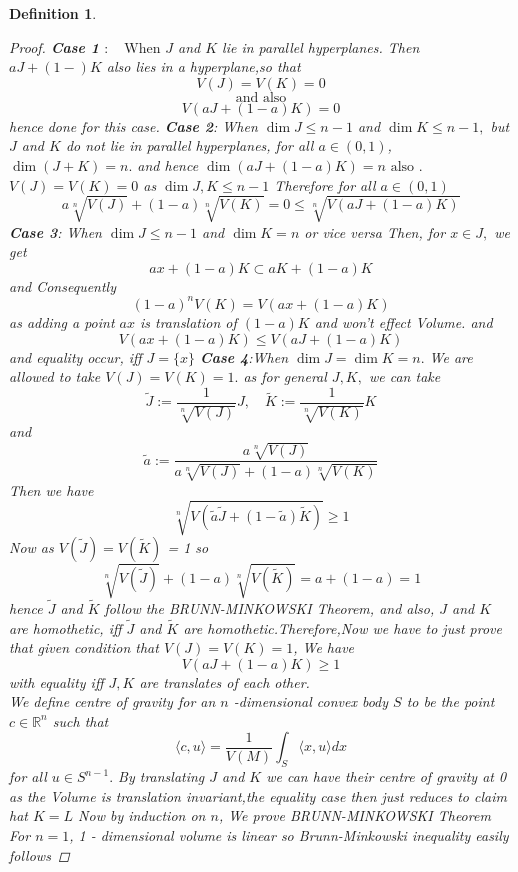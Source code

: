\documentclass[oneside]{book}
\newtheorem{mydef}{Definition}
\begin{document}
\begin{mydef}
\begin{proof}
\textbf{Case 1} $: \quad \text{When } J$ and $K$ lie in parallel hyperplanes. Then  $a J+(1-) K$  also lies in a hyperplane,\quad so that $$V(J)=V(K)=0$$    $$\text{and also}$$ $$V(a J+(1-a) K)=0$$
 hence done for this case.
 \hfill \break
\textbf{Case 2}: \quad  When $\operatorname{dim} J \leq n-1$ and $\operatorname{dim} K \leq n-1,$ but $J$ and $K$ do not lie in parallel hyperplanes, for all $a \in(0,1)$, $\operatorname{dim}(J+K)=n .$ and hence  $\operatorname{dim}(a J+(1-a) K)=n \text{ also }.$ 
\hfill \break
$V(J) = V(K)= 0$ as $\operatorname{dim} J,K \leq n-1 $ Therefore for all $a \in(0,1)$
 $$
a \sqrt[n]{V(J)}+(1-a) \sqrt[n]{V(K)}=0 \leq \sqrt[n]{V(a J+(1-a) K)}
$$
\hfill \break
\textbf{Case 3}: \quad  When $\operatorname{dim } J \leq n-1$ and $\operatorname{dim} K=n$ or vice versa
\hfill \break 
Then, for $x \in J,$ we get
\[
a x+(1-a) K \subset a K+(1-a) K
\]
and Consequently
\[
(1-a)^{n} V(K)=V(a x+(1-a) K) 
\]
as adding a point $a x $ is translation of $(1-a) K$ and won't effect Volume. 
and
$$ V(a x+(1-a) K) \leq V(a 
J+(1-a) K)$$
and equality occur, iff $J=\{x\}$ 
\hfill \break
\textbf{Case 4}:When $\operatorname{dim} J=\operatorname{dim} K=n .$  We are allowed to take $V(J)=V(K)=1 .$ as for general $J, K,$  we  can take
\[
  \widetilde{J}:=\frac{1}{\sqrt[n]{V(J)}} J, \quad \widetilde{K}:=\frac{1}{\sqrt[n]{V(K)}} K
\]
and
\[
\widetilde{a}:=\frac{a \sqrt[n]{V(J)}}{a \sqrt[n]{V(J)}+(1-a) \sqrt[n]{V(K)}}
\]
Then we have
\[
    \sqrt[n]{V({\widetilde{a} \widetilde{ J} }+(1-\widetilde{a}) \widetilde{K})} \geq 1
\]
Now  as $V(\widetilde{J}) = V(\widetilde{K})$ = 1 so $$\sqrt[n]{V(\widetilde{J})}+(1-a) \sqrt[n]{V(\widetilde {K})}=a+(1-a)=1$$
hence $\widetilde{J}$ and $\widetilde{K}$
follow the BRUNN-MINKOWSKI Theorem,  and also, $J$ and $K$ are homothetic, iff $\widetilde{J}$ and $\widetilde{K}$ are homothetic.Therefore,Now  we have to just prove that given condition that $V(J)=V(K)=1$, We have 
\[
V(a J+(1-a) K) \geq 1
\]
with equality iff $J, K$ are translates of each other.
\\
 We define centre of gravity for an $n$ -dimensional convex body $S$ to be the point $c \in \mathbb{R}^{n}$ such that
\[
\langle c, u\rangle=\frac{1}{V(M)} \int_{S}\langle x, u\rangle d x
\]
for all $u \in S^{n-1} .$ \newpage
By translating  $J$ and $K$ we can have their centre of gravity at 0 as the Volume is translation invariant,the equality case then just reduces to claim hat $K=L$
\hfill \break
Now by induction on $n$, We prove  BRUNN-MINKOWSKI Theorem 
\hfill \break
For $n=1$, 1 - dimensional volume is linear so Brunn-Minkowski inequality easily follows 

\end{proof}
\end{mydef}
\end{document}
